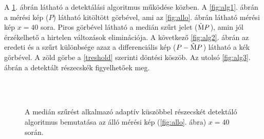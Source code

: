 	A \ref{fig:alg}. ábrán látható a detektálási algoritmus működése közben.
	A \ref{fig:alg1}. ábrán a mérési kép ($P$) látható kitöltött görbével, ami az \ref{fig:allo}. ábrán
	látható mérési kép $x=40$ sora.
	Piros görbével látható a medián szűrt jelet ($\mathrm{\hat{M}}P$), amin jól érzékelhető a hirtelen
	változások eliminációja.
	A következő \ref{fig:alg2}. ábrán az eredeti és a szűrt különbsége azaz a differenciális kép
	($P - \mathrm{\hat{M}}P$) látható a kék görbével. A zöld görbe a \eqref{treshold} szerinti
	döntési köszöb.
	Az utolsó \ref{fig:alg3}. ábrán a detektált részecskék figyelhetőek meg.
	
	\begin{figure}[!h]
		\centering
		\\
		\\
		\caption[Adaptív küszöb bemutatása]{A medián szűrést alkalmazó adaptív küszöbbel részecskét
		detektáló algoritmus bemutatása az álló mérési kép (\ref{fig:allo}. ábra) $x=40$ során.}
		\label{fig:alg}
	\end{figure}
	
